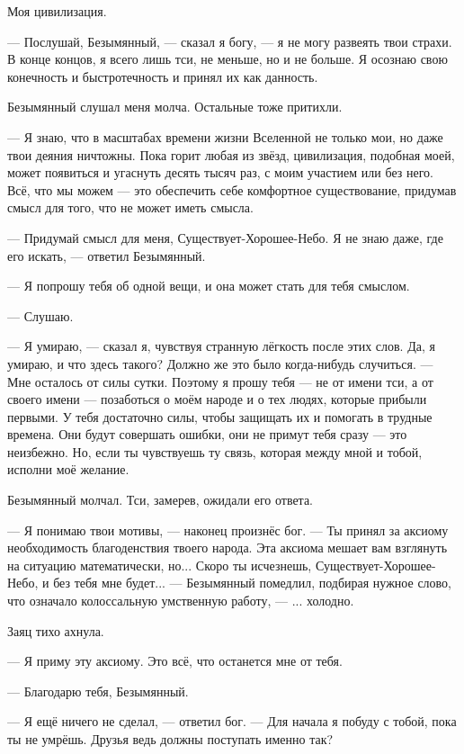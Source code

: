 Моя цивилизация.

--- Послушай, Безымянный, --- сказал я богу, --- я не могу развеять твои страхи.
В конце концов, я всего лишь тси, не меньше, но и не больше.
Я осознаю свою конечность и быстротечность и принял их как данность.

Безымянный слушал меня молча.
Остальные тоже притихли.

--- Я знаю, что в масштабах времени жизни Вселенной не только мои, но даже твои деяния ничтожны.
Пока горит любая из звёзд, цивилизация, подобная моей, может появиться и угаснуть десять тысяч раз, с моим участием или без него.
Всё, что мы можем --- это обеспечить себе комфортное существование, придумав смысл для того, что не может иметь смысла.

--- Придумай смысл для меня, Существует-Хорошее-Небо.
Я не знаю даже, где его искать, --- ответил Безымянный.

--- Я попрошу тебя об одной вещи, и она может стать для тебя смыслом.

--- Слушаю.

--- Я умираю, --- сказал я, чувствуя странную лёгкость после этих слов.
Да, я умираю, и что здесь такого?
Должно же это было когда-нибудь случиться.
--- Мне осталось от силы сутки.
Поэтому я прошу тебя --- не от имени тси, а от своего имени --- позаботься о моём народе и о тех людях, которые прибыли первыми.
У тебя достаточно силы, чтобы защищать их и помогать в трудные времена.
Они будут совершать ошибки, они не примут тебя сразу --- это неизбежно.
Но, если ты чувствуешь ту связь, которая между мной и тобой, исполни моё желание.

Безымянный молчал.
Тси, замерев, ожидали его ответа.

--- Я понимаю твои мотивы, --- наконец произнёс бог.
--- Ты принял за аксиому необходимость благоденствия твоего народа.
Эта аксиома мешает вам взглянуть на ситуацию математически, но...
Скоро ты исчезнешь, Существует-Хорошее-Небо, и без тебя мне будет... --- Безымянный помедлил, подбирая нужное слово, что означало колоссальную умственную работу, --- ... холодно.

Заяц тихо ахнула.

--- Я приму эту аксиому.
Это всё, что останется мне от тебя.

--- Благодарю тебя, Безымянный.

--- Я ещё ничего не сделал, --- ответил бог.
--- Для начала я побуду с тобой, пока ты не умрёшь.
Друзья ведь должны поступать именно так?

